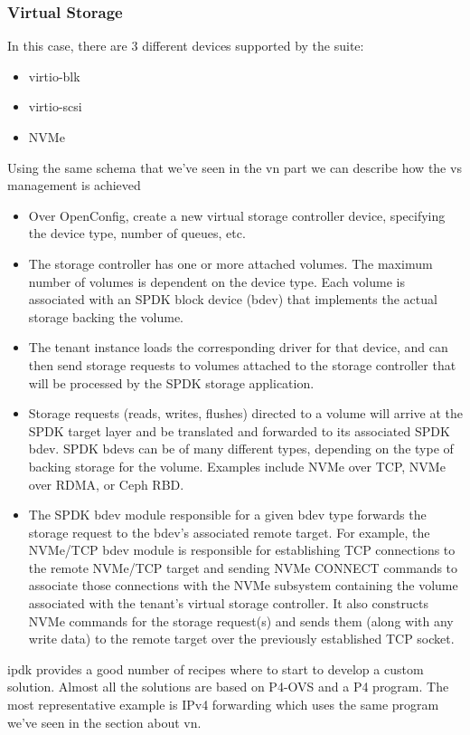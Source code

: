 \documentclass[../sn.tex]{subfiles}
\begin{document}
\subsubsection{Virtual Storage}
In this case, there are 3 different devices supported by the suite:
\begin{itemize}
    \item virtio-blk
    \item virtio-scsi
    \item NVMe
\end{itemize}
Using the same schema that we've seen in the \acrshort{vn} part we can describe how the \acrlong{vs} management is achieved
\begin{itemize}
    \item {} Over OpenConfig, create a new virtual storage controller device, specifying the device type, number of queues, etc.
    \item {} The storage controller has one or more attached volumes.
    The maximum number of volumes is dependent on the device type.
    Each volume is associated with an SPDK block device (bdev) that implements the actual storage backing the volume.
    \item {} The tenant instance loads the corresponding driver for that device, and can then send storage requests to volumes attached to the storage controller that will be processed by the SPDK storage application.
    \item {} Storage requests (reads, writes, flushes) directed to a volume will arrive at the SPDK target layer and be translated and forwarded to its associated SPDK bdev.
    SPDK bdevs can be of many different types, depending on the type of backing storage for the volume.
    Examples include NVMe over TCP, NVMe over RDMA, or Ceph RBD.
    \item {} The SPDK bdev module responsible for a given bdev type forwards the storage request to the bdev's associated remote target.
    For example, the NVMe/TCP bdev module is responsible for establishing TCP connections to the remote NVMe/TCP target and sending NVMe CONNECT commands to associate those connections with the NVMe subsystem containing the volume associated with the tenant's virtual storage controller.
    It also constructs NVMe commands for the storage request(s) and sends them (along with any write data) to the remote target over the previously established TCP socket.
\end{itemize}
\acrshort{ipdk} provides a good number of recipes where to start to develop a custom solution.
Almost all the solutions are based on P4-OVS and a P4 program.
The most representative example is IPv4 forwarding which uses the same program we've seen in the section about \acrlong{vn}.
\end{document}

